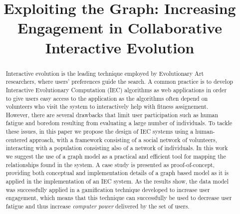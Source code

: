 \documentclass[conference]{IEEEtran}
\begin{document}

\title{Exploiting the Graph: Increasing Engagement in Collaborative Interactive Evolution}



\author{
\and
{}
\and
{}
}

\maketitle

\begin{abstract}
Interactive evolution is the leading technique employed by 
Evolutionary Art researchers, where users' preferences guide the search. A common
practice is to develop Interactive Evolutionary Computation (IEC) algorithms
as web applications in order to give users easy access to the
application as the algorithms 
often depend on volunteers who visit the system to interactively help with fitness assignement. 
However, there are several drawbacks that limit user participation 
such as human fatigue and boredom resulting from evaluating 
a large number of individuals. 
To tackle these issues, in this paper we propose the design of IEC systems using a human-centered 
approach, with a framework consisting of a social network of 
volunteers, interacting with a population consisting also of a network 
of individuals. In this work we suggest the use of a graph model as a practical 
and efficient tool for mapping the relationships 
found in the system. A case study is presented as proof-of-concept, 
providing both conceptual and implementation details of a graph based model 
as it is  applied in the implementation of an IEC system. 
As the results show, the data model was successfully applied in a gamification technique 
developed to increase user engagement, which means that this technique can successfully be used to
decrease user fatigue and thus increase {\em computer power}
delivered by the set of users.






\end{abstract}
\end{document}
